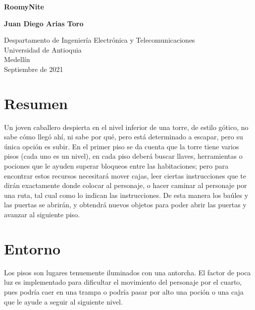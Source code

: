 \documentclass{article}
\begin{document}
\begin{titlepage}
    \begin{center}
        \vspace*{1cm}
            
        \Huge
        \textbf{RoomyNite}
            
        \vspace{0.5cm}
        \LARGE
        
            
        \vspace{1.5cm}
            
        \textbf{Juan Diego Arias Toro}
            
        \vfill
            
        \vspace{0.8cm}
            
        \Large
        Despartamento de Ingeniería Electrónica y Telecomunicaciones\\
        Universidad de Antioquia\\
        Medellín\\
        Septiembre de 2021
            
    \end{center}
\end{titlepage}

\tableofcontents
\newpage
\section{Resumen}\label{intro}
Un joven caballero despierta en el nivel inferior de una torre, de estilo gótico, no sabe cómo llegó ahí, ni sabe por qué, pero está determinado a escapar, pero su única opción es subir. En el primer piso se da cuenta que la torre tiene varios pisos (cada uno es un nivel), en cada piso deberá buscar llaves, herramientas o pociones que le ayuden superar bloqueos entre las habitaciones; pero para encontrar estos recursos necesitará mover cajas, leer ciertas instrucciones que te dirán exactamente donde colocar al personaje, o hacer caminar al personaje por una ruta, tal cual como lo indican las instrucciones. De esta manera los baúles y las puertas se abrirán, y obtendrá nuevos objetos para poder abrir las puertas y avanzar al siguiente piso.

\section{Entorno}\label{intro}
Los pisos son lugares tenuemente iluminados con una antorcha. El factor de poca luz es implementado para dificultar el movimiento del personaje por el cuarto, pues podría caer en una trampa o podría pasar por alto una poción o una caja que le ayude a seguir al siguiente nivel.
\end{document}
